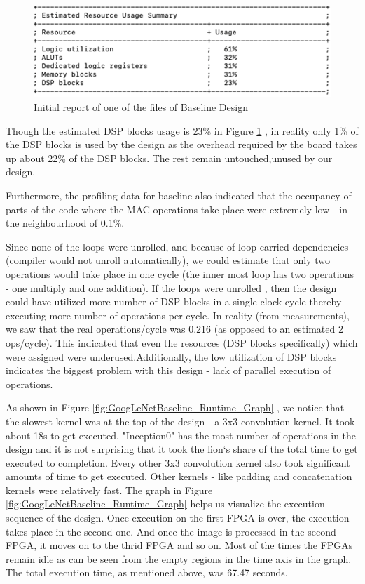\begin{figure}[!htb]
  \includegraphics[width=\textwidth,height=\textheight,keepaspectratio]{img/Report_Baseline.png}
  \caption{Initial report of one of the files of Baseline Design}
  \label{fig:Report_Baseline}
\end{figure}

Though the estimated DSP blocks usage is 23\% in Figure \ref{fig:Report_Baseline} , in reality only 1\% of the DSP blocks is used by the design as the overhead required by the board takes up about 22\% of the DSP blocks. The rest remain untouched,unused by our design.

Furthermore, the profiling data for baseline also indicated that the occupancy of  parts of the code where the MAC operations take place were extremely low - in the neighbourhood of 0.1\%. 

Since none of the loops were unrolled, and because of loop carried dependencies (compiler would not unroll automatically), we could estimate that only two operations would take place in one cycle (the inner most loop has two operations - one multiply and one addition). If the loops were unrolled , then the design could have utilized more number of DSP blocks in a single clock cycle thereby executing more number of operations per cycle. In reality (from measurements), we saw that the real operations/cycle was 0.216 (as opposed to an estimated 2 ops/cycle). This indicated that even the resources (DSP blocks specifically) which were assigned were underused.Additionally, the low utilization of DSP blocks indicates the biggest problem with this design - lack of parallel execution of operations.  

As shown in Figure \ref{fig:GoogLeNetBaseline_Runtime_Graph} , we notice that the slowest kernel was at the top of the design - a 3x3 convolution kernel. It took about 18s to get executed. "Inception0" has the most number of operations in the design and it is not surprising that it took the lion`s share of the total time to get executed to completion. Every other 3x3 convolution kernel also took significant amounts of time to get executed. Other kernels - like padding and concatenation kernels were relatively fast. The graph in Figure \ref{fig:GoogLeNetBaseline_Runtime_Graph} helps us visualize the execution sequence of the design. Once execution on the first FPGA is over, the execution takes place in the second one. And once the image is processed in the second FPGA, it moves on to the thrid FPGA and so on. Most of the times the FPGAs remain idle as can be seen from the empty regions in the time axis in the graph. The total execution time, as mentioned above, was 67.47 seconds.

